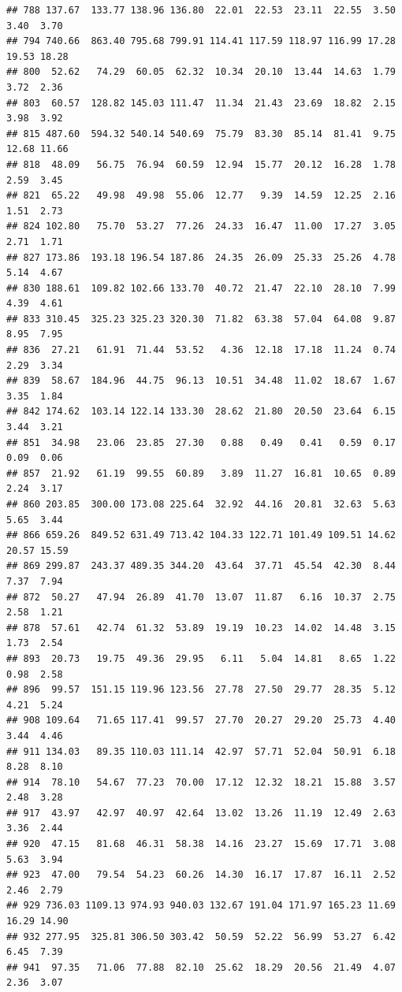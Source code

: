 \documentclass[]{article}
\begin{document}
\begin{verbatim}
## 788 137.67  133.77 138.96 136.80  22.01  22.53  23.11  22.55  3.50  3.40  3.70
## 794 740.66  863.40 795.68 799.91 114.41 117.59 118.97 116.99 17.28 19.53 18.28
## 800  52.62   74.29  60.05  62.32  10.34  20.10  13.44  14.63  1.79  3.72  2.36
## 803  60.57  128.82 145.03 111.47  11.34  21.43  23.69  18.82  2.15  3.98  3.92
## 815 487.60  594.32 540.14 540.69  75.79  83.30  85.14  81.41  9.75 12.68 11.66
## 818  48.09   56.75  76.94  60.59  12.94  15.77  20.12  16.28  1.78  2.59  3.45
## 821  65.22   49.98  49.98  55.06  12.77   9.39  14.59  12.25  2.16  1.51  2.73
## 824 102.80   75.70  53.27  77.26  24.33  16.47  11.00  17.27  3.05  2.71  1.71
## 827 173.86  193.18 196.54 187.86  24.35  26.09  25.33  25.26  4.78  5.14  4.67
## 830 188.61  109.82 102.66 133.70  40.72  21.47  22.10  28.10  7.99  4.39  4.61
## 833 310.45  325.23 325.23 320.30  71.82  63.38  57.04  64.08  9.87  8.95  7.95
## 836  27.21   61.91  71.44  53.52   4.36  12.18  17.18  11.24  0.74  2.29  3.34
## 839  58.67  184.96  44.75  96.13  10.51  34.48  11.02  18.67  1.67  3.35  1.84
## 842 174.62  103.14 122.14 133.30  28.62  21.80  20.50  23.64  6.15  3.44  3.21
## 851  34.98   23.06  23.85  27.30   0.88   0.49   0.41   0.59  0.17  0.09  0.06
## 857  21.92   61.19  99.55  60.89   3.89  11.27  16.81  10.65  0.89  2.24  3.17
## 860 203.85  300.00 173.08 225.64  32.92  44.16  20.81  32.63  5.63  5.65  3.44
## 866 659.26  849.52 631.49 713.42 104.33 122.71 101.49 109.51 14.62 20.57 15.59
## 869 299.87  243.37 489.35 344.20  43.64  37.71  45.54  42.30  8.44  7.37  7.94
## 872  50.27   47.94  26.89  41.70  13.07  11.87   6.16  10.37  2.75  2.58  1.21
## 878  57.61   42.74  61.32  53.89  19.19  10.23  14.02  14.48  3.15  1.73  2.54
## 893  20.73   19.75  49.36  29.95   6.11   5.04  14.81   8.65  1.22  0.98  2.58
## 896  99.57  151.15 119.96 123.56  27.78  27.50  29.77  28.35  5.12  4.21  5.24
## 908 109.64   71.65 117.41  99.57  27.70  20.27  29.20  25.73  4.40  3.44  4.46
## 911 134.03   89.35 110.03 111.14  42.97  57.71  52.04  50.91  6.18  8.28  8.10
## 914  78.10   54.67  77.23  70.00  17.12  12.32  18.21  15.88  3.57  2.48  3.28
## 917  43.97   42.97  40.97  42.64  13.02  13.26  11.19  12.49  2.63  3.36  2.44
## 920  47.15   81.68  46.31  58.38  14.16  23.27  15.69  17.71  3.08  5.63  3.94
## 923  47.00   79.54  54.23  60.26  14.30  16.17  17.87  16.11  2.52  2.46  2.79
## 929 736.03 1109.13 974.93 940.03 132.67 191.04 171.97 165.23 11.69 16.29 14.90
## 932 277.95  325.81 306.50 303.42  50.59  52.22  56.99  53.27  6.42  6.45  7.39
## 941  97.35   71.06  77.88  82.10  25.62  18.29  20.56  21.49  4.07  2.36  3.07

\end{verbatim}
\end{document}
